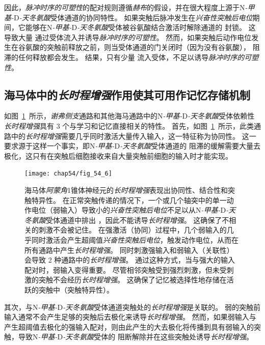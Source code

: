 因此，\textit{脉冲时序的可塑性}的配对规则遵循\textit{赫布}的假设，并在很大程度上源于N\textit{-甲基-}D\textit{-天冬氨酸}受体通道的协同特性。
如果突触后脉冲发生在\textit{兴奋性突触后电位}期间，它能够在N\textit{-甲基-}D\textit{-天冬氨酸}受体被谷氨酸结合激活时解除通道的  封锁。
这导致大量  通过受体流入并诱导\textit{脉冲时序的可塑性}。
然而，如果突触后动作电位发生在谷氨酸的突触前释放之前，则当受体通道的门关闭时（因为没有谷氨酸）， 阻滞的任何释放都会发生。
结果，只有少量  流入受体，不足以诱导\textit{脉冲时序的可塑性}。



\subsection{海马体中的\textit{长时程增强}作用使其可用作记忆存储机制}

如图~\ref{fig:54_6}~所示，\textit{谢弗侧支}通路和其他海马通路中的N\textit{-甲基-}D\textit{-天冬氨酸}受体依赖性\textit{长时程增强}具有 3 个与学习和记忆直接相关的特性。
首先，如图~\ref{fig:54_6}~所示，此类通路中的\textit{长时程增强}需要几乎同时激活大量传入输入，这一特征称为协同性。
这一要求源于这样一个事实，即N\textit{-甲基-}D\textit{-天冬氨酸}受体通道的  阻滞的缓解需要大量去极化，这只有在突触后细胞接收来自大量突触前细胞的输入时才能实现。


\begin{figure}[htbp]
	\centering
	\texttt{[image: chap54/fig\_54\_6]}
	\caption{海马体\textit{阿蒙角}1锥体神经元的\textit{长时程增强}表现出协同性、结合性和突触特异性。
		在正常突触传递的情况下，一个或几个轴突中的单一动作电位（弱输入）导致小的\textit{兴奋性突触后电位}不足以从N\textit{-甲基-}D\textit{-天冬氨酸}受体通道中排出 ，因此不能诱导\textit{长时程增强}。
		这确保了不相关的刺激不会被记住。 
		在强激活（协同）过程中，几个弱输入的几乎同时激活会产生超阈值\textit{兴奋性突触后电位}，触发动作电位，从而在所有通路中产生\textit{长时程增强}。
		同时刺激强输入和弱输入（关联性）会导致 2 种通路中的\textit{长时程增强}。
		通过这种方式，当与强大的输入配对时，弱输入变得重要。
		尽管相邻突触受到强烈刺激，但未受刺激的突触不会经历\textit{长时程增强}。
		这确保了记忆被选择性地存储在活跃的突触中（突触特异性）。}
	\label{fig:54_6}
\end{figure}


其次，与N\textit{-甲基-}D\textit{-天冬氨酸}受体通道突触处的\textit{长时程增强}是关联的。
弱的突触前输入通常不会产生足够的突触后去极化来诱导\textit{长时程增强}。
然而，如果弱输入与产生超阈值去极化的强输入配对，则由此产生的大去极化将传播到具有弱输入的突触，导致N\textit{-甲基-}D\textit{-天冬氨酸}受体的  阻断解除并在这些突触处诱导\textit{长时程增强}。


